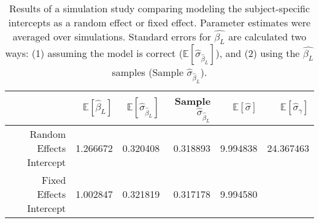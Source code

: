 \begin{table}[ht]
\centering
\begingroup\small
\begin{tabular}{rrrrrr}
  \toprule
 & $\mathbb{E}\left[\hat{\beta}_L\right]$ & $\mathbb{E}\left[\hat{\sigma}_{\hat{\beta}_L}\right]$ & Sample $\hat{\sigma}_{\hat{\beta}_L}$ & $\mathbb{E}\left[\hat{\sigma}\right]$ & $\mathbb{E}\left[\hat{\sigma}_{\gamma}\right]$ \\ 
  \midrule
Random Effects Intercept & 1.266672 & 0.320408 & 0.318893 & 9.994838 & 24.367463 \\ 
  Fixed Effects Intercept & 1.002847 & 0.321819 & 0.317178 & 9.994580 &  \\ 
   \bottomrule
\end{tabular}
\endgroup
\caption{\small Results of a simulation study comparing modeling the  subject-specific intercepts as a random effect or fixed effect. Parameter estimates were averaged over simulations. Standard errors for $\hat{\beta_L}$ are calculated two ways: (1) assuming the model is correct ($\mathbb{E}\left[\hat{\sigma}_{\hat{\beta}_L}\right]$), and (2) using the $\hat{\beta_L}$ samples (Sample $\hat{\sigma}_{\hat{\beta}_L}$).} 
\label{tab:simulation_comparison}
\end{table}
